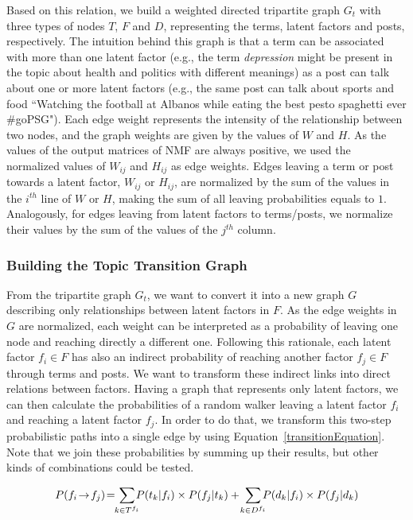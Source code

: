 Based on this relation, we build a weighted directed tripartite graph $G_t$ with three types of nodes $T$, $F$ and $D$,
representing the terms, latent factors and posts, respectively.
The intuition behind this graph is that a term can be associated with more than one latent factor (e.g., the term \textit{depression} might be present in the topic about health and politics with different meanings) as a post can talk about one or more latent factors (e.g., the same post can talk about sports and food ``Watching the football at Albanos while eating the best pesto spaghetti ever \#goPSG"). 
Each edge weight represents the intensity of the relationship between
two nodes, and the graph weights are given by the values of $W$ and $H$. As the values of the output matrices of
NMF are always positive, we used the normalized values of $W_{ij}$ and $H_{ij}$ as edge weights. Edges leaving a
term or post towards a latent factor, $W_{ij}$ or $H_{ij}$, are normalized by the sum of the values in the $i^{th}$
line of $W$ or $H$, making the sum of all leaving probabilities equals to $1$. Analogously, for edges leaving from
latent factors to terms/posts, we normalize their values by the sum of the values of the $j^{th}$ column.


\subsubsection{Building the Topic Transition Graph}

From the tripartite graph $G_t$, we want to convert it into a new graph $G$ describing only relationships between
latent factors in $F$. 
As the edge weights in $G$ are normalized, each weight can be interpreted
as a probability of leaving one node and reaching directly a different one. Following this rationale, each latent factor
$f_i \in F$ has also an indirect probability of reaching another factor $f_j \in F$ through terms and posts. We want to
transform these indirect links into direct relations between factors. 
Having a graph that represents only latent factors, we can then calculate the probabilities of a random walker leaving a  latent factor $f_i$ and reaching a latent factor $f_j$.
In order to do that, we transform this two-step probabilistic
paths into a single edge by using Equation~\ref{transitionEquation}. Note that we join these probabilities by summing up their results, but other kinds of combinations could be tested.

\begin{scriptsize}
\begin{equation} \small
P(f_i \!\rightarrow \!f_j)\! = \!\!\sum_{k \in T^{f_i}}\!\!\! P( t_k|f_i) \times P( f_j|t_k)  + \!\sum_{k \in D^{f_i}}\!\!\! P(d_k|f_i) \times P (f_j|d_k) \\
\label{transitionEquation}
\end{equation}
\end{scriptsize}

